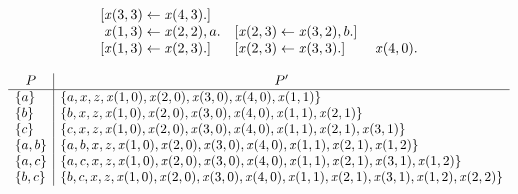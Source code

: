 \begin{Loesung}
\begin{UList}
\begin{equation*}
\begin{array}[t]{r@{{}\leftarrow{}}l@{\qquad}r@{{}\leftarrow{}}l@{\quad}r@{{}\leftarrow{}}l@{\quad}r@{{}\leftarrow{}}l}
[\mathit{x}(3,3) & \mathit{x}(4,3).]
\\
\multicolumn{3}{r@{{}\leftarrow{}}}{\mathit{x}(1,3)} & \mathit{x}(2,2),a.
& 
[\mathit{x}(2,3) & \mathit{x}(3,2),b.]
\\
\multicolumn{3}{r@{{}\leftarrow{}}}{[\mathit{x}(1,3)} & \mathit{x}(2,3).]
&
[\mathit{x}(2,3) & \mathit{x}(3,3).]
&
\multicolumn{2}{@{}l}{\phantom{[}\mathit{x}(4,0).}
\end{array}
\end{equation*}
\item
\begin{equation*}
\begin{array}{l|l}
\multicolumn{1}{c|}{P} & \multicolumn{1}{c}{P'}
\\\hline
\{a\}
&
\{a,x,z,\mathit{x}(1,0),\mathit{x}(2,0),\mathit{x}(3,0),\mathit{x}(4,0),\mathit{x}(1,1)\}
\\
\{b\}
&
\{b,x,z,\mathit{x}(1,0),\mathit{x}(2,0),\mathit{x}(3,0),\mathit{x}(4,0),\mathit{x}(1,1),\mathit{x}(2,1)\}
\\
\{c\}
&
\{c,x,z,\mathit{x}(1,0),\mathit{x}(2,0),\mathit{x}(3,0),\mathit{x}(4,0),\mathit{x}(1,1),\mathit{x}(2,1),\mathit{x}(3,1)\}
\\
\{a,b\}
&
\{a,b,x,z,\mathit{x}(1,0),\mathit{x}(2,0),\mathit{x}(3,0),\mathit{x}(4,0),\mathit{x}(1,1),\mathit{x}(2,1),\mathit{x}(1,2)\}
\\
\{a,c\}
&
\{a,c,x,z,\mathit{x}(1,0),\mathit{x}(2,0),\mathit{x}(3,0),\mathit{x}(4,0),\mathit{x}(1,1),\mathit{x}(2,1),\mathit{x}(3,1),\mathit{x}(1,2)\}
\\
\{b,c\}
&
\{b,c,x,z,\mathit{x}(1,0),\mathit{x}(2,0),\mathit{x}(3,0),\mathit{x}(4,0),\mathit{x}(1,1),\mathit{x}(2,1),\mathit{x}(3,1),\mathit{x}(1,2),\mathit{x}(2,2)\}
\end{array}
\end{equation*}
\end{UList}
\newpage
\end{Loesung}

